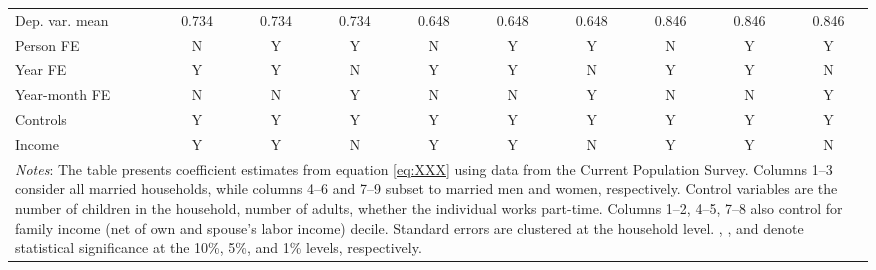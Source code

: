 {\begin{tabular}{l*{9}{c}}
Dep. var. mean      &       0.734         &       0.734         &       0.734         &       0.648         &       0.648         &       0.648         &       0.846         &       0.846         &       0.846         \\
Person FE           &           N         &           Y         &           Y         &           N         &           Y         &           Y         &           N         &           Y         &           Y         \\
Year FE             &           Y         &           Y         &           N         &           Y         &           Y         &           N         &           Y         &           Y         &           N         \\
Year-month FE       &           N         &           N         &           Y         &           N         &           N         &           Y         &           N         &           N         &           Y         \\
Controls            &           Y         &           Y         &           Y         &           Y         &           Y         &           Y         &           Y         &           Y         &           Y         \\
Income              &           Y         &           Y         &           N         &           Y         &           Y         &           N         &           Y         &           Y         &           N         \\
\bottomrule
\multicolumn{10}{p{17cm}}{\footnotesize \textit{Notes}: The table presents coefficient estimates from equation \ref{eq:XXX} using data from the Current Population Survey. Columns 1--3 consider all married households, while columns 4--6 and 7--9 subset to married men and women, respectively. Control variables are the number of children in the household, number of adults, whether the individual works part-time. Columns 1--2, 4--5, 7--8 also control for family income (net of own and spouse's labor income) decile. Standard errors are clustered at the household level. \sym{*}, \sym{**}, and \sym{***} denote statistical significance at the 10\%, 5\%, and 1\% levels, respectively.}\\
\end{tabular}
}
